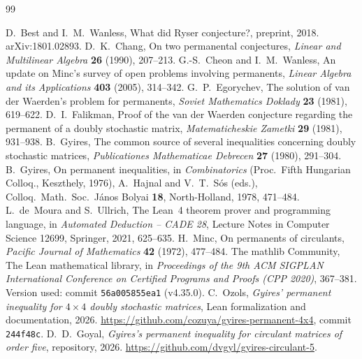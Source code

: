 \documentclass[11pt,a4paper]{article}
\theoremstyle{definition}
\theoremstyle{remark}
\begin{document}
\begin{thebibliography}{99}\small
\raggedright
{} D.~Best and I.~M.~Wanless, What did Ryser conjecture?, preprint, 2018. arXiv:1801.02893.
 D.~K.~Chang, On two permanental conjectures, \emph{Linear and Multilinear Algebra} \textbf{26} (1990),
207--213.
 G.-S.~Cheon and I.~M.~Wanless, An update on Minc's survey of open problems involving permanents,
\emph{Linear Algebra and its Applications} \textbf{403} (2005), 314--342.
 G.~P.~Egorychev, The solution of van der Waerden's problem for permanents, \emph{Soviet
Mathematics Doklady} \textbf{23} (1981), 619--622.
 D.~I.~Falikman, Proof of the van der Waerden conjecture regarding the permanent of a doubly
stochastic matrix, \emph{Matematicheskie Zametki} \textbf{29} (1981), 931--938.
 B.~Gyires, The common source of several inequalities concerning doubly stochastic matrices,
\emph{Publicationes Mathematicae Debrecen} \textbf{27} (1980), 291--304.
 B.~Gyires, On permanent inequalities, in \emph{Combinatorics} (Proc.\ Fifth Hungarian Colloq.,
Keszthely, 1976), A.~Hajnal and V.~T.~S\'os (eds.), Colloq.\ Math.\ Soc.\ J\'anos Bolyai \textbf{18}, North-Holland,
1978, 471--484.
 L.~de~Moura and S.~Ullrich, The Lean~4 theorem prover and programming language, in \emph{Automated
Deduction -- CADE 28}, Lecture Notes in Computer Science 12699, Springer, 2021, 625--635.
 H.~Minc, On permanents of circulants, \emph{Pacific Journal of Mathematics} \textbf{42} (1972),
477--484.
 The mathlib Community, The Lean mathematical library, in \emph{Proceedings of the 9th ACM SIGPLAN
International Conference on Certified Programs and Proofs (CPP 2020)}, 367--381. Version used: commit
\texttt{56a005855ea1} (v4.35.0).
 C.~Ozols, \emph{Gyires' permanent inequality for $4\times4$ doubly stochastic matrices}, Lean
formalization and documentation, 2026. \url{https://github.com/cozuya/gyires-permanent-4x4}, commit
\texttt{244f48c}.
 D.~D.~Goyal, \emph{Gyires's permanent inequality for circulant matrices of order five}, repository, 2026.
\url{https://github.com/dvgyl/gyires-circulant-5}.
\end{thebibliography}
\end{document}
